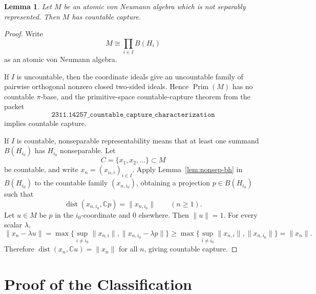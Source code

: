 \documentclass[11pt]{article}
\newtheorem{lemma}{Lemma}
\newcommand{\C}{\mathbb C}
\newcommand{\dist}{\operatorname{dist}}
\newcommand{\Prim}{\operatorname{Prim}}
\begin{document}
\begin{lemma}
\label{lem:atomic}
Let \(M\) be an atomic von Neumann algebra which is not separably represented.
Then \(M\) has countable capture.
\end{lemma}

\begin{proof}
Write
\[
        M\cong \prod_{i\in I} B(H_i)
\]
as an atomic von Neumann algebra.

If \(I\) is uncountable, then the coordinate ideals give an uncountable family
of pairwise orthogonal nonzero closed two-sided ideals.  Hence \(\Prim(M)\)
has no countable \(\pi\)-base, and the primitive-space countable-capture
theorem from the packet
\[
\texttt{2311.14257\_countable\_capture\_characterization}
\]
implies countable capture.

If \(I\) is countable, nonseparable representability means that at least one
summand \(B(H_{i_0})\) has \(H_{i_0}\) nonseparable.  Let
\[
        C=\{x_1,x_2,\ldots\}\subset M
\]
be countable, and write \(x_n=(x_{n,i})_{i\in I}\).  Apply
Lemma~\ref{lem:nonsep-bh} in \(B(H_{i_0})\) to the countable family
\((x_{n,i_0})\), obtaining a projection \(p\in B(H_{i_0})\) such that
\[
        \dist(x_{n,i_0},\C p)=\|x_{n,i_0}\|
        \qquad(n\ge1).
\]
Let \(u\in M\) be \(p\) in the \(i_0\)-coordinate and \(0\) elsewhere.  Then
\(\|u\|=1\).  For every scalar \(\lambda\),
\[
        \|x_n-\lambda u\|
        =
        \max\Big\{
            \sup_{i\ne i_0}\|x_{n,i}\|,
            \|x_{n,i_0}-\lambda p\|
        \Big\}
        \ge
        \max\Big\{
            \sup_{i\ne i_0}\|x_{n,i}\|,
            \|x_{n,i_0}\|
        \Big\}
        =
        \|x_n\|.
\]
Therefore \(\dist(x_n,\C u)=\|x_n\|\) for all \(n\), giving countable
capture.
\end{proof}

\section*{Proof of the Classification}
\end{document}

